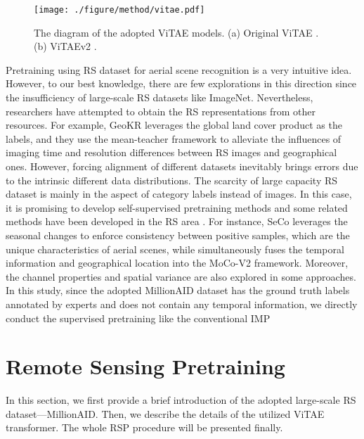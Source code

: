 \documentclass[10pt, journal,twoside]{IEEEtran}
\begin{document}
 \begin{figure*}[h]
  \centering
  \texttt{[image: ./figure/method/vitae.pdf]}\\
  \caption{The diagram of the adopted ViTAE models. (a) Original ViTAE \cite{xu2021vitae}. (b) ViTAEv2 \cite{vitae_v2}.}
  \label{vitae}
\end{figure*}

 Pretraining using RS dataset for aerial scene recognition is a very intuitive idea. However, to our best knowledge, there are few explorations in this direction since the insufficiency of large-scale RS datasets like ImageNet. Nevertheless, researchers have attempted to obtain the RS representations from other resources. For example, GeoKR \cite{geokr} leverages the global land cover product as the labels, and they use the mean-teacher framework to alleviate the influences of imaging time and resolution differences between RS images and geographical ones. However, forcing alignment of different datasets inevitably brings errors due to the intrinsic different data distributions. The scarcity of large capacity RS dataset is mainly in the aspect of category labels instead of images. In this case, it is promising to develop self-supervised pretraining methods \cite{simclr, mocov2, regioncl, mae} and some related methods have been developed in the RS area \cite{seco, saumoco, geography_aware, hyperspectral_color}. For instance, SeCo \cite{seco} leverages the seasonal changes to enforce consistency between positive samples, which are the unique characteristics of aerial scenes, while \cite{geography_aware} simultaneously fuses the temporal information and geographical location into the MoCo-V2 \cite{mocov2} framework. Moreover, the channel properties \cite{hyperspectral_color} and spatial variance \cite{saumoco} are also explored in some approaches. In this study, since the adopted MillionAID dataset has the ground truth labels annotated by experts and does not contain any temporal information, we directly conduct the supervised pretraining like the conventional IMP

 \section{Remote Sensing Pretraining}


 In this section, we first provide a brief introduction of the adopted large-scale RS dataset---MillionAID. Then, we describe the details of the utilized ViTAE transformer. The whole RSP procedure will be presented finally.
 
\end{document}
